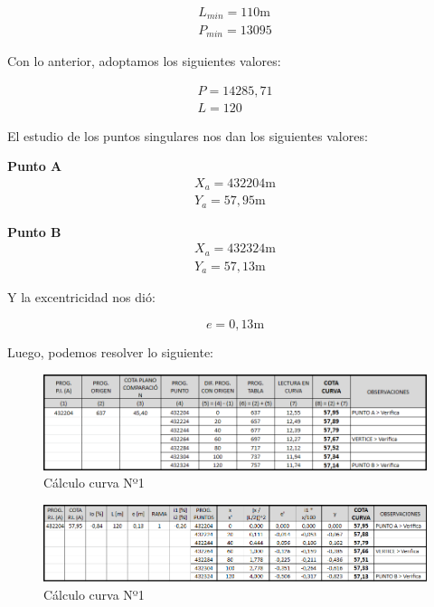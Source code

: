 \documentclass[../main.tex]{subfiles}
\begin{document}
\begin{align*}
    L_{min} = 110 \text{m} \\
    P_{min} = 13095
\end{align*}

Con lo anterior, adoptamos los siguientes valores:

\begin{align*}
    P = 14285,71  \\
    L = 120
\end{align*}

El estudio de los puntos singulares nos dan los siguientes valores:

\textbf{Punto A}
\begin{align*}
    X_a = 432204 \text{m} \\
    Y_a = 57,95 \text{m}
\end{align*}

\textbf{Punto B}
\begin{align*}
    X_a = 432324 \text{m} \\
    Y_a = 57,13 \text{m}
\end{align*}

Y la excentricidad nos dió:

\begin{equation*}
    e = 0,13 \text{m}
\end{equation*}

Luego, podemos resolver lo siguiente:

\begin{figure}[h]
    \centering
    \includegraphics[width=\textwidth]{images/google_sheets/Screenshot_10.png}
    \caption{Cálculo curva Nº1}
    \label{fig:curva1-1}
\end{figure}

\begin{figure}[h]
    \centering
    \includegraphics[width=\textwidth]{images/google_sheets/Screenshot_11.png}
    \caption{Cálculo curva Nº1}
    \label{fig:curva1-2}
\end{figure}
\end{document}
